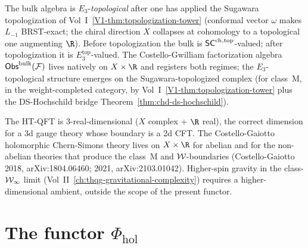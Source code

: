 \begin{remark}
\label{rem:uhf-e3-scope}
The bulk algebra is $E_3$-\emph{topological} after one has
applied the Sugawara topologization of Vol~I~\ref*{V1-thm:topologization-tower}
(conformal vector $\omega$ makes $L_{-1}$ BRST-exact; the chiral
direction $X$ collapses at cohomology to a topological one
augmenting $\R$). Before topologization the bulk is
$\mathsf{SC}^{\mathrm{ch},\mathrm{top}}$-valued; after topologization it is
$E_3^{\mathrm{top}}$-valued. The Costello-Gwilliam factorization
algebra $\mathsf{Obs}^{\mathrm{bulk}}(\mathcal{F})$ lives natively on $X \times \R$
and registers both regimes; the $E_3$-topological structure
emerges on the Sugawara-topologized complex (for class~M, in the
weight-completed category, by Vol~I~\ref*{V1-thm:topologization-tower}
plus the DS-Hochschild bridge
Theorem~\ref*{thm:chd-ds-hochschild}).
\end{remark}

\begin{remark}
\label{rem:uhf-geometry-one-real-direction}
The HT-QFT is 3-real-dimensional ($X$ complex + $\R$ real), the
correct dimension for a 3d gauge theory whose boundary is a 2d CFT.
The Costello-Gaiotto holomorphic Chern-Simons theory lives on
$X \times \R$ for abelian and for the non-abelian theories that
produce the class~M and $\mathcal{W}$-boundaries (Costello-Gaiotto 2018,
arXiv:1804.06460; 2021, arXiv:2103.01042). Higher-spin gravity in
the class-$\mathcal{W}_\infty$ limit (Vol~II~\ref*{ch:thqg-gravitational-complexity})
requires a higher-dimensional ambient, outside the scope of the
present functor.
\end{remark}

\section{The functor $\Phi_{\mathrm{hol}}$}
\label{sec:uhf-functor}

